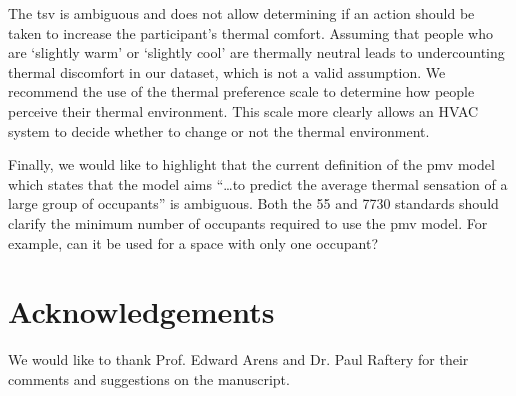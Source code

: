 The \ac{tsv} is ambiguous and does not allow determining if an action should be taken to increase the participant's thermal comfort.
Assuming that people who are `slightly warm' or `slightly cool' are thermally neutral leads to undercounting thermal discomfort in our dataset, which is not a valid assumption.
We recommend the use of the thermal preference scale to determine how people perceive their thermal environment. 
This scale more clearly allows an HVAC system to decide whether to change or not the thermal environment.

Finally, we would like to highlight that the current definition of the \ac{pmv} model which states that the model aims ``\ldots to predict the average thermal sensation of a large group of occupants'' is ambiguous.
Both the \gls{55} and \gls{7730} standards should clarify the minimum number of occupants required to use the \ac{pmv} model.
For example, can it be used for a space with only one occupant?

\section*{Acknowledgements}\label{sec:acknowledgements}
We would like to thank Prof. Edward Arens and Dr. Paul Raftery for their comments and suggestions on the manuscript.